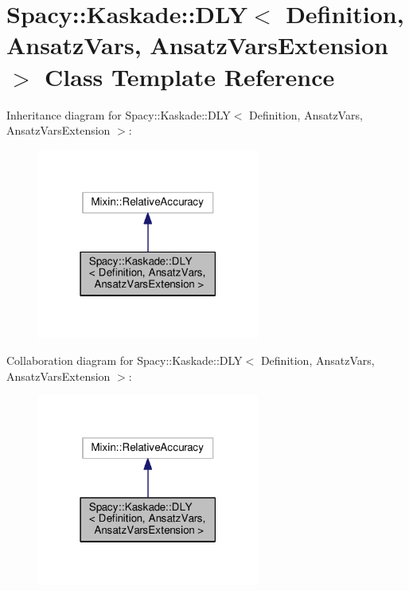 \hypertarget{classSpacy_1_1Kaskade_1_1DLY}{}\section{Spacy\+:\+:Kaskade\+:\+:D\+LY$<$ Definition, Ansatz\+Vars, Ansatz\+Vars\+Extension $>$ Class Template Reference}
\label{classSpacy_1_1Kaskade_1_1DLY}


Inheritance diagram for Spacy\+:\+:Kaskade\+:\+:D\+LY$<$ Definition, Ansatz\+Vars, Ansatz\+Vars\+Extension $>$\+:
\nopagebreak
\begin{figure}[H]
\begin{center}
\leavevmode
\includegraphics[width=207pt]{classSpacy_1_1Kaskade_1_1DLY__inherit__graph}
\end{center}
\end{figure}


Collaboration diagram for Spacy\+:\+:Kaskade\+:\+:D\+LY$<$ Definition, Ansatz\+Vars, Ansatz\+Vars\+Extension $>$\+:
\nopagebreak
\begin{figure}[H]
\begin{center}
\leavevmode
\includegraphics[width=207pt]{classSpacy_1_1Kaskade_1_1DLY__coll__graph}
\end{center}
\end{figure}
